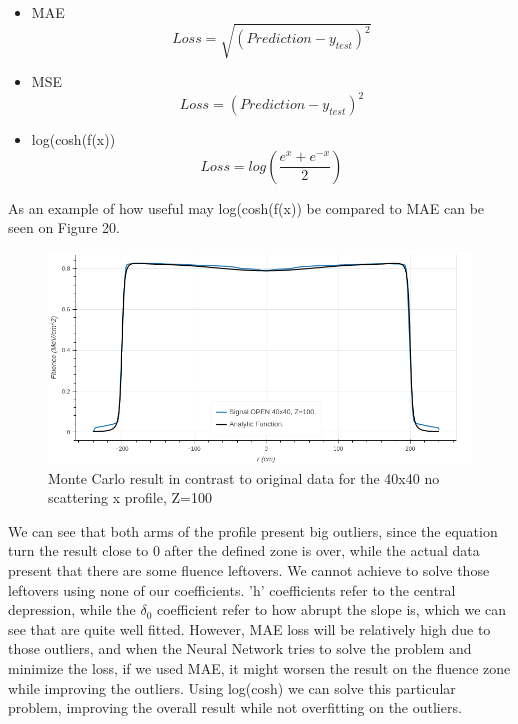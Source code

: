 \documentclass[openany]{article}
\begin{document}
\begin{itemize}
    \item MAE
    \begin{equation}
        Loss = \sqrt{(Prediction-y_{test})^2}
    \end{equation}
    \item MSE
    \begin{equation}
        Loss = (Prediction-y_{test})^2
    \end{equation}
    \item log(cosh(f(x))
    \begin{equation}
        Loss = log(\frac{e^x + e^{-x}}{2})
    \end{equation}
\end{itemize}

As an example of how useful may log(cosh(f(x)) be compared to MAE can be seen on Figure 20.

\begin{figure}[!h]
    \centering
    \includegraphics[width=\textwidth]{Outlier example.png}
    \caption{Monte Carlo result in contrast to original data for the 40x40 no scattering x profile, Z=100}
    \label{fig:my_label}
\end{figure}

We can see that both arms of the profile present big outliers, since the equation turn the result close to 0 after the defined zone is over, while the actual data present that there are some fluence leftovers. We cannot achieve to solve those leftovers using none of our coefficients. 'h' coefficients refer to the central depression, while the \(\delta_0\) coefficient refer to how abrupt the slope is, which we can see that are quite well fitted. However, MAE loss will be relatively high due to those outliers, and when the Neural Network tries to solve the problem and minimize the loss, if we used MAE, it might worsen the result on the fluence zone while improving the outliers. Using log(cosh) we can solve this particular problem, improving the overall result while not overfitting on the outliers. 
\end{document}
